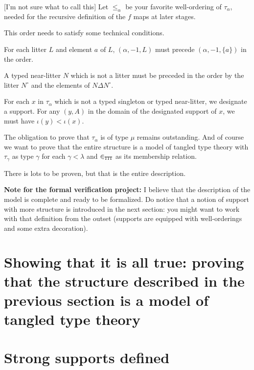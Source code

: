 \begin{definition}
\label {def:word-obligation}

[I'm not sure what to call this]  Let $\leq_\alpha$ be your favorite well-ordering of $\tau_\alpha$, needed for the recursive definition of the $f$ maps at later stages.

This order needs to satisfy some technical conditions.

For each litter $L$ and element $a$ of $L$, $(\alpha,-1,L)$ must precede $(\alpha,-1,\{a\})$ in the order.

A typed near-litter $N$ which is not a litter must be preceded in the order by the litter $N^\circ$ and the elements of
$N \Delta N^\circ$.

For each $x$ in $\tau_\alpha$ which is not a typed singleton or typed near-litter, we designate a support.  For any $(y,A)$ in the domain of the designated support of $x$, we must have $\iota(y)<\iota(x)$.

\end{definition}


The obligation to prove that $\tau_\alpha$ is of type $\mu$ remains outstanding.  And of course we want to prove that the entire structure is a model of tangled type theory with $\tau_\gamma$ as type $\gamma$ for each $\gamma<\lambda$ and $\in_{\tt TTT}$ as its membership relation.

There is lots to be proven, but that is the entire description.


{\bf Note for the formal verification project:}  I believe that the description of the model is complete and ready to be formalized.  Do notice that a notion of support with more structure is introduced in the next section:  you might want to work with that definition from the outset (supports are equipped with well-orderings and some extra decoration).


\newpage

\section{Showing that it is all true:  proving that the structure described in the previous section is a model of tangled type theory}

\section{Strong supports defined}

